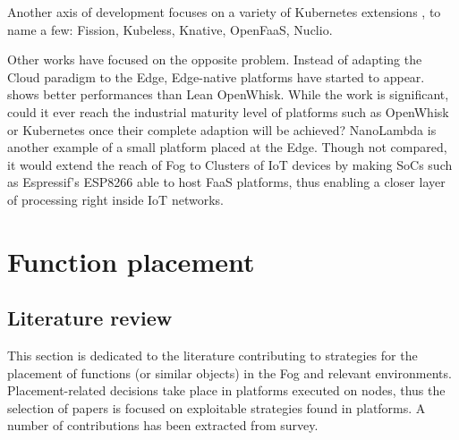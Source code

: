 Another axis of development focuses on a variety of Kubernetes extensions \cite{bocci_secure_2021}, to name a few: Fission, Kubeless, Knative, OpenFaaS, Nuclio.

Other works have focused on the opposite problem. Instead of adapting the Cloud paradigm to the Edge, Edge-native platforms have started to appear. \citet{pfandzelter_tinyfaas_2020} shows better performances than Lean OpenWhisk. While the work is significant, could it ever reach the industrial maturity level of platforms such as OpenWhisk or Kubernetes once their complete adaption will be achieved?  NanoLambda is another example of a small platform placed at the Edge. Though not compared, it would extend the reach of Fog to Clusters of IoT devices by making \glspl{SoC} such as Espressif's ESP8266 \cite{noauthor_esp8266_nodate} able to host \gls{FaaS} platforms, thus enabling a closer layer of processing right inside \gls{IoT} networks.

\section{Function placement}
\label{sec:placement}

\subsection{Literature review \label{sec:literature_review}}

This section is dedicated to the literature contributing to strategies for the placement of functions (or similar objects) in the Fog and relevant environments. Placement-related decisions take place in platforms executed on nodes, thus the selection of papers is focused on exploitable strategies found in platforms. A number of contributions has been extracted from  survey.

